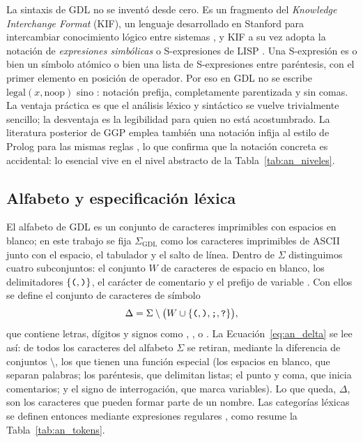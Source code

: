 La sintaxis de GDL no se inventó desde cero. Es un fragmento del \textit{Knowledge Interchange Format} (KIF), un lenguaje desarrollado en Stanford para intercambiar conocimiento lógico entre sistemas \cite{GeneserethFikes1992KIF}, y KIF a su vez adopta la notación de \emph{expresiones simbólicas} o S-expresiones de LISP \cite{McCarthy1960}. Una S-expresión es o bien un símbolo atómico o bien una lista de S-expresiones entre paréntesis, con el primer elemento en posición de operador. Por eso en GDL no se escribe $\text{legal}(x, \text{noop})$ sino : notación prefija, completamente parentizada y sin comas. La ventaja práctica es que el análisis léxico y sintáctico se vuelve trivialmente sencillo; la desventaja es la legibilidad para quien no está acostumbrado. La literatura posterior de GGP emplea también una notación infija al estilo de Prolog para las mismas reglas \cite{GeneserethThielscher2014}, lo que confirma que la notación concreta es accidental: lo esencial vive en el nivel abstracto de la Tabla~\ref{tab:an_niveles}.

\subsection{Alfabeto y especificación léxica}

El alfabeto de GDL es un conjunto de caracteres imprimibles con espacios en blanco; en este trabajo se fija $\Sigma_{\mathrm{GDL}}$ como los caracteres imprimibles de ASCII junto con el espacio, el tabulador y el salto de línea. Dentro de $\Sigma$ distinguimos cuatro subconjuntos: el conjunto $W$ de caracteres de espacio en blanco, los delimitadores $\{\texttt{(}, \texttt{)}\}$, el carácter de comentario \kw{;} y el prefijo de variable . Con ellos se define el conjunto de caracteres de símbolo
\begin{equation}
    \Delta = \Sigma \setminus \big( W \cup \{\texttt{(}, \texttt{)}, \texttt{;}, \texttt{?}\} \big),
    \label{eq:an_delta}
\end{equation}
que contiene letras, dígitos y signos como \kw{<}, \kw{=}, \kw{-} o \kw{\_}. La Ecuación~\eqref{eq:an_delta} se lee así: de todos los caracteres del alfabeto $\Sigma$ se retiran, mediante la diferencia de conjuntos $\setminus$, los que tienen una función especial (los espacios en blanco, que separan palabras; los paréntesis, que delimitan listas; el punto y coma, que inicia comentarios; y el signo de interrogación, que marca variables). Lo que queda, $\Delta$, son los caracteres que pueden formar parte de un nombre. Las categorías léxicas se definen entonces mediante expresiones regulares \cite{HopcroftMotwaniUllman2006}, como resume la Tabla~\ref{tab:an_tokens}.

